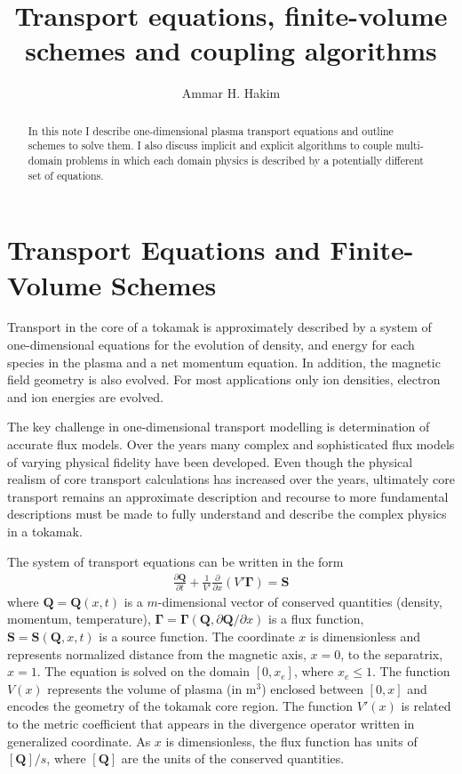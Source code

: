 \documentclass[reqno]{amsart}
\title{Transport equations, finite-volume schemes and coupling
  algorithms}%
\author{Ammar H. Hakim}%
\date{}
\newcommand{\pfrac}[2]{\frac{\partial #1}{\partial #2}}
\newcommand{\pfraca}[1]{\frac{\partial}{\partial #1}}
\newcommand{\pfracb}[2]{\partial #1/\partial #2}
\newcommand{\mvec}[1]{\mathbf{#1}}
\newcommand{\gvec}[1]{\boldsymbol{#1}}
\theoremstyle{definition}
\begin{document}

\begin{abstract}
  In this note I describe one-dimensional plasma transport equations
  and outline schemes to solve them. I also discuss implicit and
  explicit algorithms to couple multi-domain problems in which each
  domain physics is described by a potentially different set of
  equations.
\end{abstract}

\maketitle

\section{Transport Equations and Finite-Volume Schemes}

Transport in the core of a tokamak is approximately described by a
system of one-dimensional equations for the evolution of density, and
energy for each species in the plasma and a net momentum equation. In
addition, the magnetic field geometry is also evolved. For most
applications only ion densities, electron and ion energies are
evolved.

The key challenge in one-dimensional transport modelling is
determination of accurate flux models. Over the years many complex and
sophisticated flux models of varying physical fidelity have been
developed. Even though the physical realism of core transport
calculations has increased over the years, ultimately core transport
remains an approximate description and recourse to more fundamental
descriptions must be made to fully understand and describe the complex
physics in a tokamak.

The system of transport equations can be written in the form
\begin{align}
  \pfrac{\mvec{Q}}{t} 
  + \frac{1}{V'} \pfraca{x} \left( V' \gvec{\Gamma} \right) = \mvec{S}
  \label{eq:transport}
\end{align}
where $\mvec{Q} = \mvec{Q}(x,t)$ is a $m$-dimensional vector of
conserved quantities (density, momentum, temperature), $\gvec{\Gamma}
= \gvec{\Gamma}(\mvec{Q},\pfracb{\mvec{Q}}{x})$ is a flux function,
$\mvec{S} = \mvec{S}(\mvec{Q},x,t)$ is a source function. The
coordinate $x$ is dimensionless and represents normalized distance
from the magnetic axis, $x=0$, to the separatrix, $x=1$. The equation
is solved on the domain $[0,x_e]$, where $x_e \le 1$. The function
$V(x)$ represents the volume of plasma (in m$^3$) enclosed between
$[0,x]$ and encodes the geometry of the tokamak core region. The
function $V'(x)$ is related to the metric coefficient that appears in
the divergence operator written in generalized coordinate. As $x$ is
dimensionless, the flux function has units of $[\mvec{Q}]/s$, where
$[\mvec{Q}]$ are the units of the conserved quantities.
\end{document}
